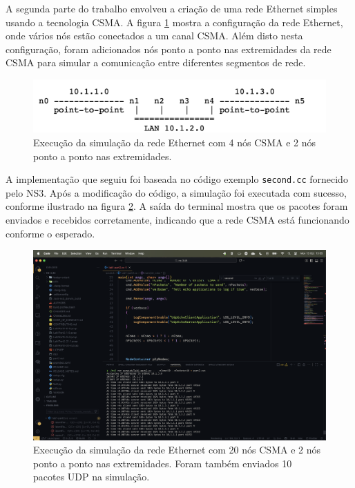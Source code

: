 \documentclass[12pt,a4paper]{article}
\begin{document}
A segunda parte do trabalho envolveu a criação de uma rede Ethernet simples usando a tecnologia CSMA. A figura \ref{fig:ethernet_topology} mostra a configuração da rede Ethernet, onde vários nós estão conectados a um canal CSMA. Além disto nesta configuração, foram adicionados nós ponto a ponto nas extremidades da rede CSMA para simular a comunicação entre diferentes segmentos de rede.

\begin{figure}
    \centering
    \includegraphics[width=1\textwidth]{layout_csma.png}
    \caption{Execução da simulação da rede Ethernet com 4 nós CSMA e 2 nós ponto a ponto nas extremidades.}
    \label{fig:ethernet_topology}
\end{figure}

A implementação que seguiu foi baseada no código exemplo \texttt{second.cc} fornecido pelo NS3. Após a modificação do código, a simulação foi executada com sucesso, conforme ilustrado na figura \ref{fig:ethernet_simulation}. A saída do terminal mostra que os pacotes foram enviados e recebidos corretamente, indicando que a rede CSMA está funcionando conforme o esperado.

\begin{figure}
  \centering
  \includegraphics[width=1\textwidth]{run_csma.png}
  \caption{Execução da simulação da rede Ethernet com 20 nós CSMA e 2 nós ponto a ponto nas extremidades. Foram também enviados 10 pacotes UDP na simulação.}
  \label{fig:ethernet_simulation}
\end{figure}
\end{document}
